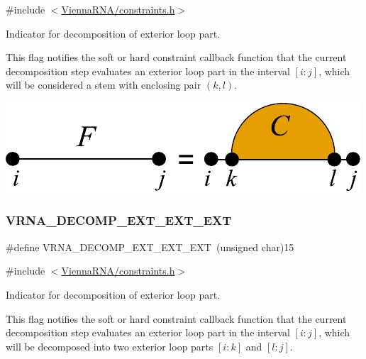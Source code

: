 {\ttfamily \#include $<$\hyperlink{constraints_8h}{Vienna\+R\+N\+A/constraints.\+h}$>$}



Indicator for decomposition of exterior loop part. 

This flag notifies the soft or hard constraint callback function that the current decomposition step evaluates an exterior loop part in the interval $[i:j]$, which will be considered a stem with enclosing pair $(k,l)$.

 
\begin{DoxyImageNoCaption}
  \mbox{\includegraphics[width=\textwidth,height=\textheight/2,keepaspectratio=true]{decomp_ext_stem}}
\end{DoxyImageNoCaption}
 \mbox{\label{group__constraints_ga803bd818b3f4b2b0a4a5cfa2f7dc2045}} 
\subsubsection{\texorpdfstring{V\+R\+N\+A\+\_\+\+D\+E\+C\+O\+M\+P\+\_\+\+E\+X\+T\+\_\+\+E\+X\+T\+\_\+\+E\+XT}{VRNA\_DECOMP\_EXT\_EXT\_EXT}}
{\footnotesize\ttfamily \#define V\+R\+N\+A\+\_\+\+D\+E\+C\+O\+M\+P\+\_\+\+E\+X\+T\+\_\+\+E\+X\+T\+\_\+\+E\+XT~(unsigned char)15}



{\ttfamily \#include $<$\hyperlink{constraints_8h}{Vienna\+R\+N\+A/constraints.\+h}$>$}



Indicator for decomposition of exterior loop part. 

This flag notifies the soft or hard constraint callback function that the current decomposition step evaluates an exterior loop part in the interval $[i:j]$, which will be decomposed into two exterior loop parts $[i:k]$ and $[l:j]$.

